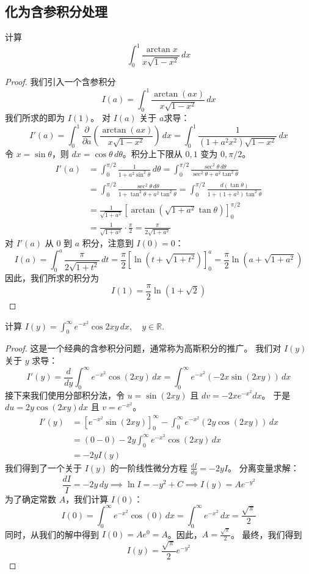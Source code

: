 \documentclass[lang=cn,10pt,thmcnt=section]{elegantbook}
\begin{document}
\subsection{化为含参积分处理}
\begin{example}
	计算 \[ \int_{0}^{1} \frac{\arctan x}{x\sqrt{1-x^2}} \, dx \]
	\end{example}
\begin{proof}
	我们引入一个含参积分
\[ I(a) = \int_{0}^{1} \frac{\arctan(ax)}{x\sqrt{1-x^2}} \, dx \]
我们所求的即为 $I(1)$。
对 $I(a)$ 关于 $a$求导：
\[ I'(a) = \int_{0}^{1} \frac{\partial}{\partial a} \left( \frac{\arctan(ax)}{x\sqrt{1-x^2}} \right) \, dx = \int_{0}^{1} \frac{1}{(1+a^2x^2)\sqrt{1-x^2}} \, dx \]
令 $x = \sin\theta$，则 $dx = \cos\theta \, d\theta$。积分上下限从 $0, 1$ 变为 $0, \pi/2$。
\begin{align*}
I'(a) &= \int_{0}^{\pi/2} \frac{1}{1+a^2\sin^2\theta} \, d\theta = \int_{0}^{\pi/2} \frac{\sec^2\theta \, d\theta}{\sec^2\theta+a^2\tan^2\theta} \\
&= \int_{0}^{\pi/2} \frac{\sec^2\theta \, d\theta}{1+\tan^2\theta+a^2\tan^2\theta} = \int_{0}^{\pi/2} \frac{d(\tan\theta)}{1+(1+a^2)\tan^2\theta} \\
&= \frac{1}{\sqrt{1+a^2}} \left[ \arctan(\sqrt{1+a^2}\tan\theta) \right]_{0}^{\pi/2} \\
&= \frac{1}{\sqrt{1+a^2}} \cdot \frac{\pi}{2} = \frac{\pi}{2\sqrt{1+a^2}}
\end{align*}
对 $I'(a)$ 从 $0$ 到 $a$ 积分，注意到 $I(0)=0$：
\[ I(a) = \int_{0}^{a} \frac{\pi}{2\sqrt{1+t^2}} \, dt = \frac{\pi}{2} \left[ \ln(t+\sqrt{1+t^2}) \right]_{0}^{a} = \frac{\pi}{2} \ln(a+\sqrt{1+a^2}) \]
因此，我们所求的积分为
\[ I(1) = \frac{\pi}{2} \ln(1+\sqrt{2}) \]

\end{proof}
	\begin{example}
	计算 \( I(y) = \int_{0}^{\infty} e^{-x^2} \cos 2xy \, dx, \quad y \in \mathbb{R} \).
	\end{example}
	\begin{proof}
		这是一个经典的含参积分问题，通常称为高斯积分的推广。
我们对 $I(y)$ 关于 $y$ 求导：
\[ I'(y) = \frac{d}{dy} \int_{0}^{\infty} e^{-x^2} \cos(2xy) \, dx = \int_{0}^{\infty} e^{-x^2} (-2x \sin(2xy)) \, dx \]
接下来我们使用分部积分法，令 $u = \sin(2xy)$ 且 $dv = -2xe^{-x^2}dx$。
于是 $du = 2y\cos(2xy)dx$ 且 $v = e^{-x^2}$。
\begin{align*}
I'(y) &= \left[ e^{-x^2}\sin(2xy) \right]_{0}^{\infty} - \int_{0}^{\infty} e^{-x^2} (2y \cos(2xy)) \, dx \\
&= (0-0) - 2y \int_{0}^{\infty} e^{-x^2} \cos(2xy) \, dx \\
&= -2y I(y)
\end{align*}
我们得到了一个关于 $I(y)$ 的一阶线性微分方程 $\frac{dI}{dy} = -2yI$。
分离变量求解：
\[ \frac{dI}{I} = -2y \, dy \implies \ln I = -y^2 + C \implies I(y) = A e^{-y^2} \]
为了确定常数 $A$，我们计算 $I(0)$：
\[ I(0) = \int_{0}^{\infty} e^{-x^2}\cos(0) \, dx = \int_{0}^{\infty} e^{-x^2} \, dx = \frac{\sqrt{\pi}}{2} \]
同时，从我们的解中得到 $I(0) = A e^0 = A$。因此，$A = \frac{\sqrt{\pi}}{2}$。
最终，我们得到
\[ I(y) = \frac{\sqrt{\pi}}{2} e^{-y^2} \]
	\end{proof}
\end{document}
